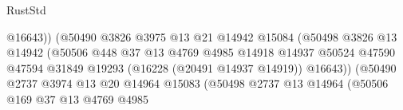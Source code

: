 \begin{lexlean}{RustStd}
\begin{coremodule}
                                                    @16643))
                                                (@50490
                                                  @3826
                                                  @3975
                                                  @13
                                                  @21
                                                  @14942
                                                  @15084
                                                  (@50498
                                                    @3826
                                                    @13
                                                    @14942
                                                    (@50506
                                                      @448
                                                      @37
                                                      @13
                                                      @4769
                                                      @4985
                                                      @14918
                                                      @14937
                                                      @50524
                                                      @47590
                                                      @47594
                                                      @31849
                                                      @19293
                                                      (@16228 (@20491 @14937 @14919))
                                                      @16643))
                                                  (@50490
                                                    @2737
                                                    @3974
                                                    @13
                                                    @20
                                                    @14964
                                                    @15083
                                                    (@50498
                                                      @2737
                                                      @13
                                                      @14964
                                                      (@50506
                                                        @169
                                                        @37
                                                        @13
                                                        @4769
                                                        @4985

\end{coremodule}
\end{lexlean}
